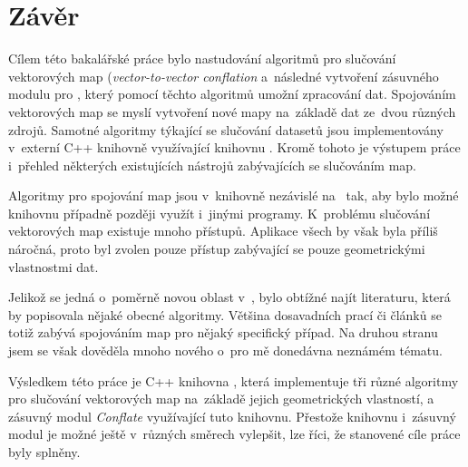 \chapter{Závěr}
\label{9-zaver}

Cílem této bakalářské práce bylo nastudování algoritmů pro
slučování vektorových map (\textit{vector-to-vector conflation}
a~následné vytvoření zásuvného modulu pro , 
který pomocí těchto algoritmů umožní zpracování dat. Spojováním
vektorových map se myslí vytvoření nové mapy na~základě
dat ze~dvou různých zdrojů. Samotné algoritmy týkající se
slučování datasetů jsou implementovány v~externí C++ knihovně
 využívající knihovnu . Kromě tohoto 
je výstupem práce i~přehled některých existujících nástrojů 
zabývajících se slučováním map. 

Algoritmy pro spojování map jsou v~knihovně nezávislé 
na~  tak, aby bylo možné knihovnu 
případně později využít i~jinými programy. K~problému slučování
vektorových map existuje mnoho přístupů. Aplikace všech by
však byla příliš náročná, proto byl zvolen pouze přístup 
zabývající se pouze geometrickými vlastnostmi dat.

Jelikož se jedná o~poměrně novou oblast v~, bylo
obtížné najít literaturu, která by popisovala nějaké obecné 
algoritmy. Většina dosavadních prací či článků se totiž zabývá 
spojováním map pro nějaký specifický případ. Na druhou stranu
jsem se však dověděla mnoho nového o~pro mě donedávna neznámém
tématu.

Výsledkem této práce je C++ knihovna , která 
implementuje tři různé algoritmy pro slučování vektorových map 
na~základě jejich geometrických vlastností, a zásuvný modul 
\textit{Conflate} využívající tuto knihovnu. Přestože knihovnu
i~zásuvný modul je možné ještě v~různých směrech vylepšit,
lze říci, že stanovené cíle práce byly splněny.